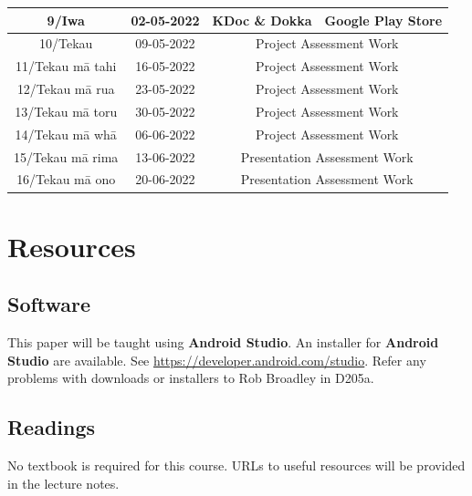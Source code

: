 \documentclass{article}
\begin{document}
\begin{tabular}{|c|c|c|c|}
	\small 9/Iwa            & \small 02-05-2022 & \cellcolor{orange} \small KDoc \& Dokka                              & \small Google Play Store      \\ \hline
	\small 10/Tekau         & \small 09-05-2022 & \multicolumn{2}{c|}{\small Project Assessment Work}                                      \\ \hline
	\small 11/Tekau mā tahi & \small 16-05-2022 & \multicolumn{2}{c|}{\small Project Assessment Work}                                      \\ \hline
	\small 12/Tekau mā rua  & \small 23-05-2022 & \multicolumn{2}{c|}{\small Project Assessment Work}                                      \\ \hline
	\small 13/Tekau mā toru & \small 30-05-2022 & \multicolumn{2}{c|}{\small Project Assessment Work}                                      \\ \hline
	\small 14/Tekau mā whā  & \small 06-06-2022 & \multicolumn{2}{c|}{\small Project Assessment Work}                                      \\ \hline
	\small 15/Tekau mā rima & \small 13-06-2022 & \multicolumn{2}{c|}{\small Presentation Assessment Work}                                 \\ \hline
	\small 16/Tekau mā ono  & \small 20-06-2022 & \multicolumn{2}{c|}{\small Presentation Assessment Work}                                 \\ \hline
\end{tabular}

\section*{Resources}

\subsection*{Software}
This paper will be taught using \textbf{Android Studio}. An installer for \textbf{Android Studio} are available. See \href{https://developer.android.com/studio/}{https://developer.android.com/studio}. Refer any problems with downloads or installers to Rob Broadley in D205a.

\subsection*{Readings}
No textbook is required for this course. URLs to useful resources will be provided in the lecture notes.
\end{document}
